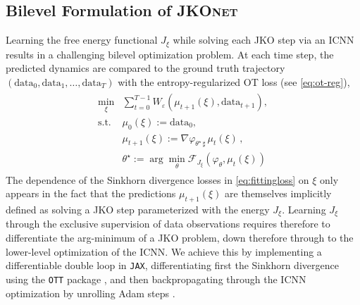 \subsection{Bilevel Formulation of \textsc{JKOnet}}
Learning the free energy functional $J_\xi$ while solving each \acrshort{JKO} step via an ICNN results in a challenging bilevel optimization problem.
At each time step, the predicted dynamics are compared to the ground truth trajectory $(\mathrm{data}_0, \mathrm{data}_1, \dots, \mathrm{data}_T)$ with the entropy-regularized OT loss (see \ref{eq:ot-reg}),
\begin{align} \label{eq:fittingloss}
\begin{split}
    \min_\xi & \sum_{t=0}^{T-1} W_\varepsilon(\mu_{t+1}(\xi), \mathrm{data}_{t+1}), \\
    \text{s.t. } & \mu_{0}(\xi) := \mathrm{data}_0, \\
      & \mu_{t+1}(\xi) := \nabla \varphi_{\theta^\star\, \sharp}\, \mu_{t}(\xi)\,, \\
      & \theta^\star:=\arg \min_{\theta} \mathcal{F}_{J_{\xi}}(\varphi_{\theta},\mu_t(\xi))
\end{split}
\end{align}
The dependence of the Sinkhorn divergence losses in \eqref{eq:fittingloss} on $\xi$ only appears in the fact that the predictions $\mu_{t+1}(\xi)$ are themselves implicitly defined as solving a \acrshort{JKO} step parameterized with the energy $J_\xi$. 
Learning  $J_\xi$ through the exclusive supervision of data observations requires therefore to differentiate the arg-minimum of a \acrshort{JKO} problem, down therefore through to the lower-level optimization of the ICNN. We achieve this by implementing a differentiable double loop in \texttt{JAX}, differentiating first the Sinkhorn divergence using the \texttt{OTT} package \citep{cuturi2022optimal}, and then backpropagating through the ICNN optimization by unrolling Adam steps \citep{kingma2014adam, metz2016unrolled, lorraine2020optimizing}.



